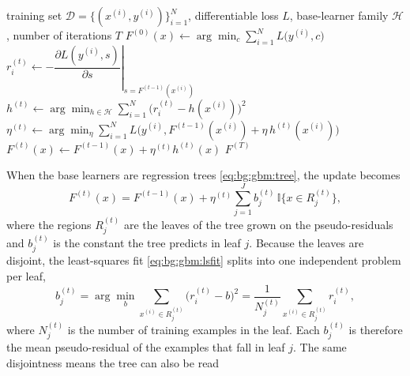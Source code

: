     \begin{algorithm}[t]
        \caption{Gradient boosting~\cite{friedman2001}}
        \label{alg:bg:gbm:gb}
        \begin{algorithmic}[1]
            \Require training set $\mathcal{D} = \{(x^{(i)}, y^{(i)})\}_{i=1}^{N}$,
                     differentiable loss $L$, base-learner family $\mathcal{H}$,
                     number of iterations $T$
            \State $F^{(0)}(x) \gets \arg\min_{c} \sum_{i=1}^{N} L\bigl(y^{(i)}, c\bigr)$
                \State $r_i^{(t)} \gets -\left.\dfrac{\partial L(y^{(i)}, s)}{\partial s}
                       \right|_{s = F^{(t-1)}(x^{(i)})}$
              \EndFor
              \State $h^{(t)} \gets \arg\min_{h \in \mathcal{H}}
                     \sum_{i=1}^{N} \bigl( r_i^{(t)} - h(x^{(i)}) \bigr)^{2}$
              \State $\eta^{(t)} \gets \arg\min_{\eta} \sum_{i=1}^{N}
                     L\bigl( y^{(i)}, F^{(t-1)}(x^{(i)}) + \eta\, h^{(t)}(x^{(i)}) \bigr)$
              \State $F^{(t)}(x) \gets F^{(t-1)}(x) + \eta^{(t)} h^{(t)}(x)$
            \EndFor
            \State \Return $F^{(T)}$
        \end{algorithmic}
    \end{algorithm}
    When the base learners are regression trees \eqref{eq:bg:gbm:tree}, the update
    becomes
    \begin{equation}
    F^{(t)}(x) = F^{(t-1)}(x) + \eta^{(t)} \sum_{j=1}^{J} b_j^{(t)}\,
    \mathbb{I}{\{x \in R_j^{(t)}\}},
    \end{equation}
    where the regions $R_j^{(t)}$ are the leaves of the tree grown on the
    pseudo-residuals and $b_j^{(t)}$ is the constant the tree predicts in leaf
    $j$. Because the leaves are disjoint, the least-squares fit
    \eqref{eq:bg:gbm:lsfit} splits into one independent problem per leaf,
    \begin{equation}
        b_j^{(t)} = \arg\min_{b} \sum_{x^{(i)} \in R_j^{(t)}} \bigl( r_i^{(t)} - b \bigr)^{2}
        = \frac{1}{N_j^{(t)}} \sum_{x^{(i)} \in R_j^{(t)}} r_i^{(t)},
        \label{eq:bg:gbm:leafmean}
    \end{equation}
    where $N_j^{(t)}$ is the number of training examples in the leaf. Each
    $b_j^{(t)}$ is therefore the mean pseudo-residual of the examples that fall in
    leaf $j$. The same disjointness means the tree can also be read
